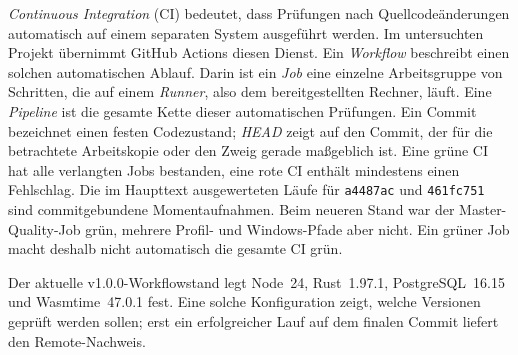 \begin{beginnerstatement}

\emph{Continuous Integration} (CI) bedeutet, dass Prüfungen nach
Quellcodeänderungen automatisch auf einem separaten System ausgeführt werden.
Im untersuchten Projekt übernimmt GitHub Actions diesen Dienst. Ein
\emph{Workflow} beschreibt einen solchen automatischen Ablauf. Darin ist ein
\emph{Job} eine einzelne Arbeitsgruppe von Schritten, die auf einem
\emph{Runner}, also dem bereitgestellten Rechner, läuft. Eine
\emph{Pipeline} ist die gesamte Kette dieser automatischen Prüfungen. Ein
Commit bezeichnet einen festen Codezustand; \emph{HEAD} zeigt auf den Commit,
der für die betrachtete Arbeitskopie oder den Zweig gerade maßgeblich ist.
Eine grüne CI hat alle verlangten Jobs bestanden, eine rote CI enthält
mindestens einen Fehlschlag. Die im
Haupttext ausgewerteten Läufe für \texttt{a4487ac} und
\texttt{461fc751} sind commitgebundene Momentaufnahmen. Beim neueren Stand war
der Master-Quality-Job grün, mehrere Profil- und Windows-Pfade aber nicht.
Ein grüner Job macht deshalb nicht automatisch die gesamte CI grün.

Der aktuelle v1.0.0-Workflowstand legt Node~24, Rust~1.97.1,
PostgreSQL~16.15 und Wasmtime~47.0.1 fest. Eine solche Konfiguration zeigt,
welche Versionen geprüft werden sollen; erst ein erfolgreicher Lauf auf dem
finalen Commit liefert den Remote-Nachweis.

\end{beginnerstatement}
